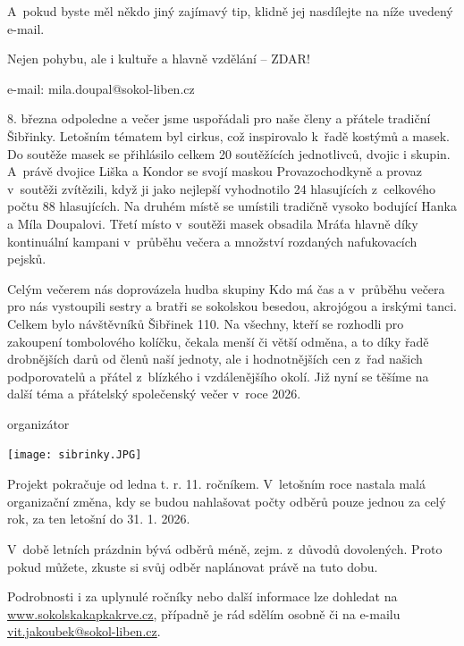 \documentclass[11pt]{article}
\begin{document}
A~pokud byste měl někdo jiný zajímavý tip, klidně jej nasdílejte na níže
uvedený e-mail.

Nejen pohybu, ale i kultuře a hlavně vzdělání -- ZDAR!

\signature{Miloslav Doupal}{e-mail: mila.doupal@sokol-liben.cz}

8. března odpoledne a večer jsme uspořádali pro naše členy a přátele
tradiční Šibřinky. Letošním tématem byl cirkus, což inspirovalo k~řadě
kostýmů a masek. Do soutěže masek se přihlásilo celkem 20 soutěžících
jednotlivců, dvojic i skupin. A~právě dvojice Liška a Kondor se svojí
maskou Provazochodkyně a provaz v~soutěži zvítězili, když ji jako
nejlepší vyhodnotilo 24 hlasujících z~celkového počtu 88 hlasujících. Na
druhém místě se umístili tradičně vysoko bodující Hanka a Míla
Doupalovi. Třetí místo v~soutěži masek obsadila Mráťa hlavně díky
kontinuální kampani v~průběhu večera a množství rozdaných nafukovacích
pejsků.

Celým večerem nás doprovázela hudba skupiny Kdo má čas a v~průběhu
večera pro nás vystoupili sestry a bratři se sokolskou besedou,
akrojógou a irskými tanci. Celkem bylo návštěvníků Šibřinek 110. Na
všechny, kteří se rozhodli pro zakoupení tombolového kolíčku, čekala
menší či větší odměna, a to díky řadě drobnějších darů od členů naší
jednoty, ale i hodnotnějších cen z~řad našich podporovatelů a přátel
z~blízkého i vzdálenějšího okolí. Již nyní se těšíme na další téma a
přátelský společenský večer v~roce 2026.

\signature{Tomáš Dragoun}{organizátor}

\begin{center}
\texttt{[image: sibrinky.JPG]}
\end{center}


Projekt pokračuje od ledna t. r. 11. ročníkem. V~letošním roce nastala
malá organizační změna, kdy se budou nahlašovat počty odběrů pouze
jednou za celý rok, za ten letošní do 31. 1. 2026.

V~době letních prázdnin bývá odběrů méně, zejm. z~důvodů dovolených.
Proto pokud můžete, zkuste si svůj odběr naplánovat právě na tuto dobu.

Podrobnosti i za uplynulé ročníky nebo další informace lze dohledat na
\href{http://www.sokolsakapkakrve.cz}{www.sokolskakapkakrve.cz},
případně je rád sdělím osobně či na e-mailu
\href{mailto:vit.jakoubek@sokol-liben.cz}{vit.jakoubek@sokol-liben.cz}.
\end{document}
